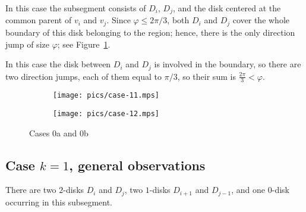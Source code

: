 \begin{enumerate}[label={\bf Case \arabic*: }, wide, labelwidth=!, labelindent=0pt]

In this case the subsegment consists of $D_i$, $D_j$, and the disk centered at the common parent of $v_i$ and $v_j$. Since $\varphi\leq 2\pi/3$, both $D_i$ and $D_j$ cover the whole boundary of this disk belonging to the region; hence, there is the only direction jump of size $\varphi$; see Figure~\ref{fig:0a_0b}.



In this case the disk between $D_i$ and $D_j$ is involved in the boundary, so there are two direction jumps, each of them equal to $\pi/3$, so their sum is $\frac{2\pi}{3} < \varphi$.

\begin{figure}[h!]
    \centering
    \begin{subfigure}{.4\textwidth}
    \texttt{[image: pics/case-11.mps]}
    \end{subfigure}
    \begin{subfigure}{.5\textwidth}
    \texttt{[image: pics/case-12.mps]}
    \end{subfigure}
    \caption{Cases 0a and 0b}
    \label{fig:0a_0b}
\end{figure}

\subsection{Case $k = 1$, general observations}


There are two $2$-disks $D_i$ and $D_j$, two $1$-disks $D_{i+1}$ and $D_{j-1}$, and one $0$-disk occurring in this subsegment.


\end{enumerate}
